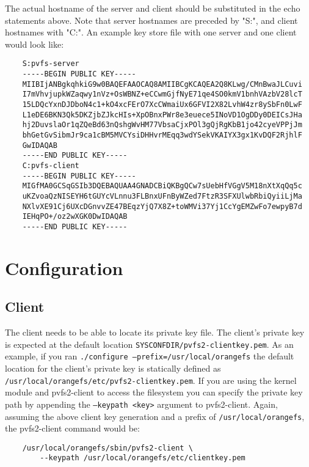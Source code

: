 \documentclass[11pt, letterpaper]{article}
\begin{document}
The actual hostname of the server and client should be substituted in the echo 
statements above. Note that server hostnames are preceded by "S:", and client 
hostnames with "C:". An example key store file with one server and one client 
would look like:

\begin{verbatim}
    S:pvfs-server
    -----BEGIN PUBLIC KEY-----
    MIIBIjANBgkqhkiG9w0BAQEFAAOCAQ8AMIIBCgKCAQEA2Q8KLwg/CMnBwaJLCuvi
    I7mVhvjupkWZaqwy1nVz+OsWBNZ+eCCwmGjfNyE71qe4SO0kmV1bnhVAzbV28lcT
    15LDQcYxnDJDboN4c1+kO4xcFErO7XcCWmaiUx6GFVI2X82LvhW4zr8ySbFn0LwF
    L1eDE6BKN3Qk5DKZjbZJkcHIs+XpOBnxPWr8e3euece5INoVD1OgDDy0DEICsJHa
    hj2DuvslaOr1qZQeBd63nQshgWvHM77VbsaCjxPOl3gQjRgKbB1jo42cyeVPPjJm
    bhGetGvSibmJr9ca1cBM5MVCYsiDHHvrMEqq3wdYSekVKAIYX3gx1KvDQF2RjhlF
    GwIDAQAB
    -----END PUBLIC KEY-----
    C:pvfs-client
    -----BEGIN PUBLIC KEY-----
    MIGfMA0GCSqGSIb3DQEBAQUAA4GNADCBiQKBgQCw7sUebHfVGgV5M18nXtXqQq5c
    uKZvoaQzNISEYH6tGUYcVLnnu3FLBnxUFnByWZed7FtzR3SFXUlwbRbiQyiiLjMa
    NXlvXE91Cj6UXcDGnvvZE47BEqzYjQ7X8Z+toWMVi37Yj1CcYgEMZwFo7ewpyB7d
    IEHqPO+/oz2wXGK0DwIDAQAB
    -----END PUBLIC KEY-----
\end{verbatim}

\section{Configuration}

\subsection{Client}
The client needs to be able to locate its private key file. The client's 
private key is expected at the default location 
\texttt{SYSCONFDIR/pvfs2-clientkey.pem}. As an example, if you ran 
\texttt{./configure --prefix=/usr/local/orangefs} the default location for the 
client's private key is statically defined as 
\texttt{/usr/local/orangefs/etc/pvfs2-clientkey.pem}. If you are using the kernel 
module and pvfs2-client to access the filesystem you can specify the private 
key path by appending the \texttt{--keypath <key>} argument to pvfs2-client. 
Again, assuming the above client key generation and a prefix of 
\texttt{/usr/local/orangefs}, the pvfs2-client command would be:

\begin{verbatim}
    /usr/local/orangefs/sbin/pvfs2-client \
        --keypath /usr/local/orangefs/etc/clientkey.pem
\end{verbatim}
\end{document}
